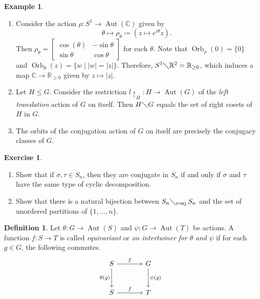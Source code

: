 \documentclass[10pt,letterpaper,cm]{nupset}
\theoremstyle{definition}
\newtheorem*{definition}{Definition}
\newtheorem{exmp}{Example}
\newtheorem{exercise}{Exercise}
\newcommand{\C}{\mathbb C}
\newcommand{\R}{\mathbb R}
\newcommand{\1}{\mathbf{1}}
\newcommand{\0}{\vec 0}
\DeclareMathOperator{\aut}{Aut}
\DeclareMathOperator{\orb}{Orb}
\begin{document}
\begin{exmp} $ $
\begin{enumerate}
\item Consider the action $\rho: S^1 \to \aut(\C)$ given by $$\theta \mapsto \rho_{\theta}\coloneqq (z \mapsto e^{i\theta}z).$$ Then $\rho_{\theta} = \begin{bmatrix} \cos(\theta) & {-}\sin{\theta} \\ \sin{\theta} & \cos{\theta} \end{bmatrix}$ for each $\theta$.  Note that $\orb_{\rho}(0) = \{0\}$ and $\orb_{\theta}(z) = \{w \mid |w| = |z|\}$. Therefore,  $S^1 \diagdown \R^2 = \R_{\geq 0}$, which induces a map $\C \to \R_{\geq 0}$ given by $z \mapsto |z|$.
\item Let $H \leq G$. Consider the restriction $l\restriction_H : H \to \aut(G)$ of the \textit{left translation} action of $G$ on itself. Then $H \diagdown G$ equals the set of right cosets of $H$ in $G$. 
\item The orbits of the conjugation action of $G$ on itself are precisely  the conjugacy classes of $G$. 
\end{enumerate}
\end{exmp}

\begin{exercise} $ $
\begin{enumerate}

\item Show that if $\sigma, \tau \in S_n$, then they are conjugate in $S_n$  if and only if $\sigma$ and $\tau$ have the same type of cyclic decomposition.
\item Show that there is a natural bijection between $S_n \diagdown_{\text{conj.}} S_n$ and the set of unordered partitions of $\{1, \ldots, n\}$.
\end{enumerate}
\end{exercise}

\begin{definition}
Let $\theta : G \to \aut(S)$ and $\psi: G \to \aut(T)$ be actions. A function $f: S \to T$ is called \textit{equivariant} or \textit{an intertwiner for $\theta$ and $\psi$} if for each $g \in G$, the following commutes.
\[
\begin{tikzcd}[row sep=large, column sep = large]
S \arrow[r, "f"] \arrow[d, "\theta(g)", swap]
& G \arrow[d, "\psi(g)"] \\
S \arrow[r, "f"]
& T
\end{tikzcd}
\]
\end{definition}
\end{document}
